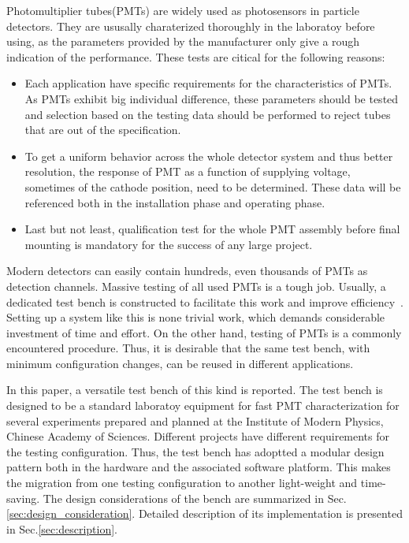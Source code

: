 \documentclass[5p, times]{elsarticle}
\begin{document}
Photomultiplier tubes(PMTs) are widely used as photosensors in particle detectors.
They are ususally charaterized thoroughly in the laboratoy before using, as the parameters provided by the manufacturer only give a rough indication of the performance.
These tests are citical for the following reasons:
\begin{itemize}
 \item Each application have specific requirements for the characteristics of PMTs.
 As PMTs exhibit big individual difference, these parameters should be tested and selection based on the testing data should be performed to reject tubes that are out of the specification.
 \item To get a uniform behavior across the whole detector system and thus better resolution, the response of PMT as a function of supplying voltage, sometimes of the cathode position, need to be determined.
  These data will be referenced both in the installation phase and operating phase. 
 \item Last but not least, qualification test for the whole PMT assembly before final mounting is mandatory for the success of any large project. 
\end{itemize}

Modern detectors can easily contain hundreds, even thousands of PMTs as detection channels.
Massive testing of all used PMTs is a tough job.
Usually, a dedicated test bench is constructed to facilitate this work and improve efficiency~\cite{barnhill_testing_2008,akgun_complete_2005,adragna_pmt-block_2006}.
Setting up a system like this is none trivial work, which demands considerable investment of time and effort.
On the other hand, testing of PMTs is a commonly encountered procedure.
Thus, it is desirable that the same test bench, with minimum configuration changes, can be reused in different applications. 

In this paper, a versatile test bench of this kind is reported.
The test bench is designed to be a standard laboratoy equipment for fast PMT characterization for several experiments prepared and planned at the Institute of Modern Physics, Chinese Academy of Sciences.
Different projects have different requirements for the testing configuration.
Thus, the test bench has adoptted a modular design pattern both in the hardware and the associated software platform.
This makes the migration from one testing configuration to another light-weight and time-saving.
The design considerations of the bench are summarized in Sec.\ref{sec:design_consideration}.
Detailed description of its implementation is presented in Sec.\ref{sec:description}.
\end{document}
